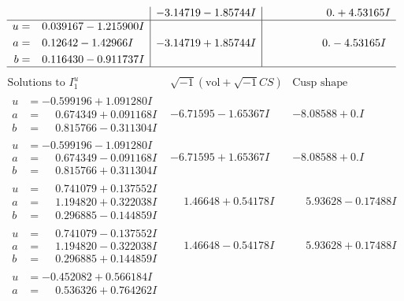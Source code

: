 \documentclass[1p]{elsarticle_modified}
\theoremstyle{definition}
\newcommand{\I}{\sqrt{-1}}
\begin{document}
$$\begin{array}{c|c|c}
 & -3.14719 - 1.85744 I & \phantom{-0.000000 -}0. + 4.53165 I \\ \hline\begin{aligned}
u &= \phantom{-}0.039167 - 1.215900 I \\
a &= \phantom{-}0.12642 - 1.42966 I \\
b &= \phantom{-}0.116430 - 0.911737 I\end{aligned}
 & -3.14719 + 1.85744 I & \phantom{-0.000000 } 0. - 4.53165 I\\
 \hline 
 \end{array}$$\newpage$$\begin{array}{c|c|c}  
\text{Solutions to }I^u_{1}& \I (\text{vol} + \sqrt{-1}CS) & \text{Cusp shape}\\
 \hline 
\begin{aligned}
u &= -0.599196 + 1.091280 I \\
a &= \phantom{-}0.674349 + 0.091168 I \\
b &= \phantom{-}0.815766 - 0.311304 I\end{aligned}
 & -6.71595 - 1.65367 I & -8.08588 + 0. I\phantom{ +0.000000I} \\ \hline\begin{aligned}
u &= -0.599196 - 1.091280 I \\
a &= \phantom{-}0.674349 - 0.091168 I \\
b &= \phantom{-}0.815766 + 0.311304 I\end{aligned}
 & -6.71595 + 1.65367 I & -8.08588 + 0. I\phantom{ +0.000000I} \\ \hline\begin{aligned}
u &= \phantom{-}0.741079 + 0.137552 I \\
a &= \phantom{-}1.194820 + 0.322038 I \\
b &= \phantom{-}0.296885 - 0.144859 I\end{aligned}
 & \phantom{-}1.46648 + 0.54178 I & \phantom{-}5.93628 - 0.17488 I \\ \hline\begin{aligned}
u &= \phantom{-}0.741079 - 0.137552 I \\
a &= \phantom{-}1.194820 - 0.322038 I \\
b &= \phantom{-}0.296885 + 0.144859 I\end{aligned}
 & \phantom{-}1.46648 - 0.54178 I & \phantom{-}5.93628 + 0.17488 I \\ \hline\begin{aligned}
u &= -0.452082 + 0.566184 I \\
a &= \phantom{-}0.536326 + 0.764262 I \\

\end{aligned}
\end{array}$$
\end{document}
